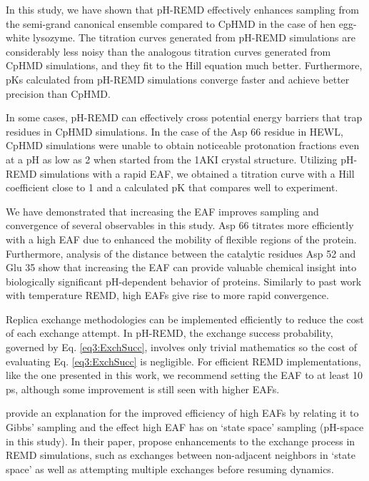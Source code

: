 In this study, we have shown that pH-REMD effectively enhances sampling from the
semi-grand canonical ensemble compared to CpHMD in the case of hen egg-white
lysozyme.  The titration curves generated from pH-REMD simulations are
considerably less noisy than the analogous titration curves generated from CpHMD
simulations, and they fit to the Hill equation much better.  Furthermore,
pKs calculated from pH-REMD simulations converge faster and achieve
better precision than CpHMD.

In some cases, pH-REMD can effectively cross potential energy barriers that trap
residues in CpHMD simulations.  In the case of the Asp 66 residue in HEWL, CpHMD
simulations were unable to obtain noticeable protonation fractions even at a pH
as low as 2 when started from the 1AKI crystal structure.  Utilizing pH-REMD
simulations with a rapid EAF, we obtained a titration curve with a Hill
coefficient close to 1 and a calculated pK that compares well to
experiment.

We have demonstrated that increasing the EAF improves sampling and convergence
of several observables in this study.  Asp 66 titrates more efficiently with a
high EAF due to enhanced the mobility of flexible regions of the protein.
Furthermore, analysis of the distance between the catalytic residues Asp 52 and
Glu 35 show that increasing the EAF can provide valuable chemical insight into
biologically significant pH-dependent behavior of proteins.  Similarly to past
work with temperature REMD, \cite{Sindhikara2008,Sindhikara2010} high EAFs give
rise to more rapid convergence.

Replica exchange methodologies can be implemented efficiently to reduce the cost
of each exchange attempt.  In pH-REMD, the exchange success probability,
governed by Eq. \ref{eq3:ExchSucc}, involves only trivial mathematics so the
cost of evaluating Eq. \ref{eq3:ExchSucc} is negligible.  For efficient REMD
implementations, like the one presented in this work, we recommend setting the
EAF to at least 10 ps, although some improvement is still seen with
higher EAFs.

\citeauthor{Chodera2011} \cite{Chodera2011} provide an explanation for the
improved efficiency of high EAFs by relating it to Gibbs' sampling and the
effect high EAF has on `state space' sampling (pH-space in this study).  In
their paper, \citeauthor{Chodera2011} propose enhancements to the exchange
process in REMD simulations, such as exchanges between non-adjacent neighbors in
`state space' as well as attempting multiple exchanges before resuming dynamics.
\cite{Chodera2011}

